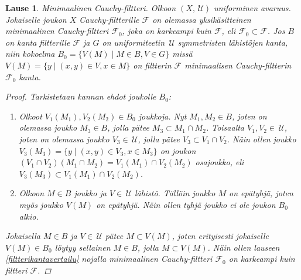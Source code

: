 \documentclass[12pt,a4paper,leqno]{report}
\newcommand{\U}{\,\mathcal{U}}
\newcommand{\F}{\mathcal{F}}
\theoremstyle{plain}
\newtheorem{lause}[equation]{Lause}
\theoremstyle{definition}
\newtheorem{maar}[equation]{Määritelmä}
\theoremstyle{remark}
\begin{document}
\begin{lause}
\emph{Minimaalinen Cauchy-filtteri.} 
Olkoon $(X,\U)$ uniforminen avaruus. 
Jokaiselle joukon $X$ Cauchy-filtterille $\F$ on olemassa yksikäsitteinen 
minimaalinen Cauchy-filtteri $\F_0$, joka on karkeampi kuin $\F$, 
eli $\F_0\subset \F$. 
Jos $B$ on kanta filtterille $\F$ ja $G$ on uniformiteetin $\U$ symmetristen lähistöjen kanta, 
niin kokoelma $B_0=\{V(M)\mid M\in B,V\in G\}$ 
missä $V(M)=\{ y\mid (x,y)\in V,x\in M \}$ on 
filtterin $\F$ minimaalisen Cauchy-filtterin $\F_0$ kanta. 
\begin{proof}
Tarkistetaan kannan ehdot joukolle $B_0$:
\begin{enumerate}
\item Olkoot $V_1(M_1),V_2(M_2)\in B_0$ joukkoja. 
Nyt $M_1,M_2\in B$, joten on olemassa joukko $M_3\in B$, 
jolla pätee $M_3\subset M_1\cap M_2$. 
Toisaalta $V_1,V_2\in \U$, joten on olemassa joukko $V_3\in\U$, 
jolla pätee $V_3\subset V_1\cap V_2$. 
Näin ollen joukko $ V_3(M_3)=\{ y\mid (x,y)\in V_3, x\in M_3 \}$ on joukon 
$(V_1\cap V_2)(M_1\cap M_2)= V_1(M_1)\cap V_2(M_2)$ osajoukko, 
eli $ V_3(M_3)\subset V_1(M_1)\cap V_2(M_2)$.
\item Olkoon $M\in B$ joukko ja $V\in \U$ lähistö. 
Tällöin joukko $M$ on epätyhjä, joten myös joukko $V(M)$ on epätyhjä. 
Näin ollen tyhjä joukko ei ole joukon $B_0$ alkio.
\end{enumerate}
Jokaisella $M\in B$ ja $V\in \U$ pätee $M\subset V(M)$, 
joten erityisesti jokaiselle $V(M)\in B_0$ löytyy sellainen $M\in B$, 
jolla $M\subset V(M)$. 
Näin ollen lauseen \ref{filtterikantavertailu} nojalla 
minimaalinen Cauchy-filtteri $\F_0$ on karkeampi kuin filtteri $\F$.
\end{proof}
\end{lause}
%
%
%
\end{document}
